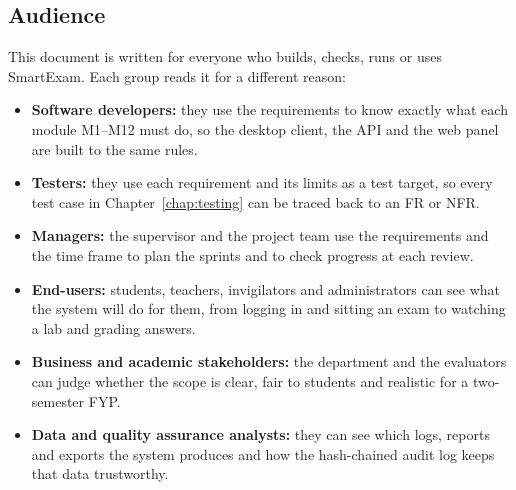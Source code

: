 \subsection{Audience}
This document is written for everyone who builds, checks, runs or uses SmartExam. Each group reads it for a different reason:
\begin{itemize}
    \item \textbf{Software developers:} they use the requirements to know exactly what each module M1--M12 must do, so the desktop client, the API and the web panel are built to the same rules.
    \item \textbf{Testers:} they use each requirement and its limits as a test target, so every test case in Chapter~\ref{chap:testing} can be traced back to an FR or NFR.
    \item \textbf{Managers:} the supervisor and the project team use the requirements and the time frame to plan the sprints and to check progress at each review.
    \item \textbf{End-users:} students, teachers, invigilators and administrators can see what the system will do for them, from logging in and sitting an exam to watching a lab and grading answers.
    \item \textbf{Business and academic stakeholders:} the department and the evaluators can judge whether the scope is clear, fair to students and realistic for a two-semester FYP.
    \item \textbf{Data and quality assurance analysts:} they can see which logs, reports and exports the system produces and how the hash-chained audit log keeps that data trustworthy.
\end{itemize}
